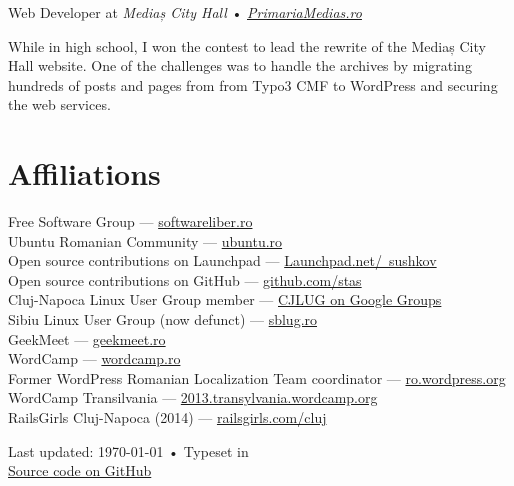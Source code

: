 \documentclass[10pt, a4paper]{article}
\newcommand{\years}[1]{\marginnote{\scriptsize #1}}
\begin{document}
\years{2007}Web Developer at \emph{Mediaș City Hall} • \emph{\href{http://www.primariamedias.ro/}{PrimariaMedias.ro}}
\\
\begin{footnotesize}
While in high school, I won the contest to lead the rewrite of the Mediaș City
Hall website. One of the challenges was to handle the archives by migrating
hundreds of posts and pages from from Typo3 CMF to WordPress and securing the
web services.
\end{footnotesize}

\section*{Affiliations}

Free Software Group --- \href{http://softwareliber.ro}{softwareliber.ro}\\
Ubuntu Romanian Community --- \href{http://ubuntu.ro}{ubuntu.ro}\\
Open source contributions on Launchpad --- \href{http://launchpad.net/~sushkov}{Launchpad.net/~sushkov}\\
Open source contributions on GitHub --- \href{http://github.com/stas/}{github.com/stas}\\
Cluj-Napoca Linux User Group member --- \href{https://groups.google.com/d/forum/cjlug}{CJLUG on Google Groups} \\
Sibiu Linux User Group (now defunct) --- \href{http://sblug.ro}{sblug.ro}\\
GeekMeet --- \href{http://geekmeet.ro}{geekmeet.ro}\\
WordCamp --- \href{http://wordcamp.ro}{wordcamp.ro}\\
Former WordPress Romanian Localization Team coordinator --- \href{http://ro.wordpress.org}{ro.wordpress.org}\\
WordCamp Transilvania --- \href{https://2013.transylvania.wordcamp.org/}{2013.transylvania.wordcamp.org}\\
RailsGirls Cluj-Napoca (2014) --- \href{http://railsgirls.com/cluj}{railsgirls.com/cluj}

\vfill{}

\begin{center}
{\scriptsize  Last updated: \today\- •\-
Typeset in \href{http://nitens.org/taraborelli/cvtex}{\XeTeX }\\
\href{https://github.com/stas/stas.github.com/commits/resume}{Source code on GitHub}
}
\end{center}
\end{document}

